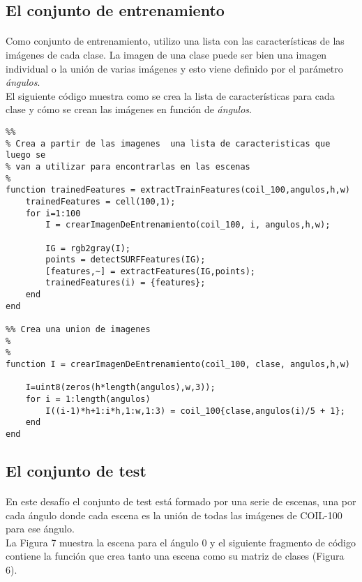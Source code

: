 \documentclass[es,gi]{ifirak}\usepackage[]{graphicx}\usepackage[]{color}
\begin{document}
\pagebreak
\subsection{El conjunto de entrenamiento}
\paragraph{} Como conjunto de entrenamiento, utilizo una lista con las características de las imágenes de cada clase. La imagen de una clase puede ser bien una imagen individual o la unión de varias imágenes y esto viene definido por el parámetro \textit{ángulos}.\\ 

El siguiente código muestra como se crea la lista de características para cada clase y cómo se crean las imágenes en función de \textit{ángulos}.

\begin{lstlisting}
%% 
% Crea a partir de las imagenes  una lista de caracteristicas que luego se
% van a utilizar para encontrarlas en las escenas
%
function trainedFeatures = extractTrainFeatures(coil_100,angulos,h,w)
    trainedFeatures = cell(100,1);
    for i=1:100
        I = crearImagenDeEntrenamiento(coil_100, i, angulos,h,w);
       
        IG = rgb2gray(I);
        points = detectSURFFeatures(IG);
        [features,~] = extractFeatures(IG,points);
        trainedFeatures(i) = {features};
    end
end

%% Crea una union de imagenes 
%   
%
function I = crearImagenDeEntrenamiento(coil_100, clase, angulos,h,w)
    
    I=uint8(zeros(h*length(angulos),w,3));
    for i = 1:length(angulos)
        I((i-1)*h+1:i*h,1:w,1:3) = coil_100{clase,angulos(i)/5 + 1};
    end 
end

\end{lstlisting}
 \pagebreak
\subsection{El conjunto de test}
\paragraph{} En este desafío el conjunto de test está formado por una serie de escenas, una por cada ángulo donde cada escena es la unión de todas las imágenes de COIL-100 para ese ángulo.\\

La Figura 7 muestra la escena para el ángulo 0 y el siguiente fragmento de código contiene la función que crea tanto una escena como su matriz de clases (Figura 6).
\end{document}
